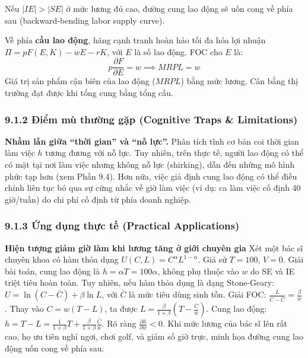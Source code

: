 \documentclass[
]{article}
\begin{document}
Nếu \(|IE| > |SE|\) ở mức lương đủ cao, đường cung lao động sẽ uốn cong
về phía sau (backward-bending labor supply curve).

Về phía \textbf{cầu lao động}, hãng cạnh tranh hoàn hảo tối đa hóa lợi
nhuận \(\Pi = pF(E, K) - wE - rK\), với \(E\) là số lao động. FOC cho
\(E\) là: \[ p \frac{\partial F}{\partial E} = w \implies MRPL = w \]
Giá trị sản phẩm cận biên của lao động (\(MRPL\)) bằng mức lương. Cân
bằng thị trường đạt được khi tổng cung bằng tổng cầu.

\subsubsection{9.1.2 Điểm mù thường gặp (Cognitive Traps \&
Limitations)}\label{ux111iux1ec3m-muxf9-thux1b0ux1eddng-gux1eb7p-cognitive-traps-limitations-69}

\textbf{Nhầm lẫn giữa ``thời gian'' và ``nỗ lực''.} Phân tích tĩnh cơ
bản coi thời gian làm việc \(h\) tương đương với nỗ lực. Tuy nhiên, trên
thực tế, người lao động có thể có mặt tại nơi làm việc nhưng không nỗ
lực (shirking), dẫn đến những mô hình phức tạp hơn (xem Phần 9.4). Hơn
nữa, việc giả định cung lao động có thể điều chỉnh liên tục bỏ qua sự
cứng nhắc về giờ làm việc (ví dụ: ca làm việc cố định 40 giờ/tuần) do
chi phí cố định từ phía doanh nghiệp.

\subsubsection{9.1.3 Ứng dụng thực tế (Practical
Applications)}\label{ux1ee9ng-dux1ee5ng-thux1ef1c-tux1ebf-practical-applications-33}

\textbf{Hiện tượng giảm giờ làm khi lương tăng ở giới chuyên gia} Xét
một bác sĩ chuyên khoa có hàm thỏa dụng
\(U(C,L) = C^{\alpha} L^{1-\alpha}\). Giả sử \(T=100\), \(V=0\). Giải
bài toán, cung lao động là \(h = \alpha T = 100\alpha\), không phụ thuộc
vào \(w\) do SE và IE triệt tiêu hoàn toàn. Tuy nhiên, nếu hàm thỏa dụng
là dạng Stone-Geary: \(U = \ln(C - \bar{C}) + \beta \ln L\), với
\(\bar{C}\) là mức tiêu dùng sinh tồn. Giải FOC:
\(\frac{L}{C-\bar{C}} = \frac{\beta}{w}\). Thay vào \(C = w(T-L)\), ta
được \(L = \frac{\beta}{1+\beta} \left( T - \frac{\bar{C}}{w} \right)\).
Cung lao động:
\(h = T - L = \frac{1}{1+\beta} T + \frac{\beta}{1+\beta} \frac{\bar{C}}{w}\).
Rõ ràng \(\frac{\partial h}{\partial w} < 0\). Khi mức lương của bác sĩ
lên rất cao, họ ưu tiên nghỉ ngơi, chơi golf, và giảm số giờ trực, minh
họa đường cung lao động uốn cong về phía sau.
\end{document}
